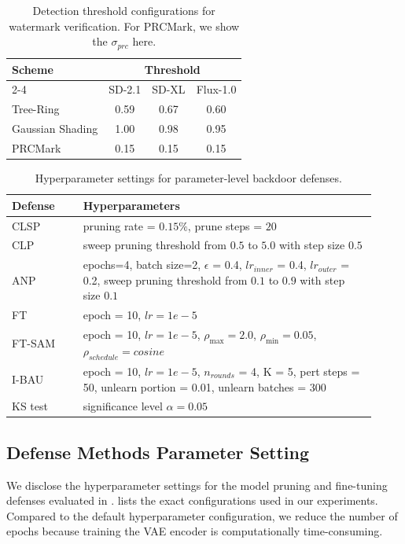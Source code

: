 \documentclass[letterpaper,twocolumn,10pt]{article}
\begin{document}
\begin{table}[t]
\centering
\caption{Detection threshold configurations for watermark verification.
For PRCMark, we show the $\sigma_{prc}$ here.}
\label{tab:wm_thresholds}
\small
\setlength{\tabcolsep}{6pt}
\renewcommand{\arraystretch}{1.15}
\begin{tabular}{lccc}
\toprule
\multirow{2}{*}{Scheme} & \multicolumn{3}{c}{Threshold} \\
\cmidrule(lr){2-4}
& SD-2.1 & SD-XL & Flux-1.0 \\
\midrule
Tree-Ring       & 0.59 & 0.67 & 0.60 \\
Gaussian Shading  & 1.00 & 0.98 & 0.95 \\
PRCMark          & 0.15 & 0.15 & 0.15 \\
\bottomrule
\end{tabular}
\end{table}
\begin{table}[t]
\centering
\caption{Hyperparameter settings for parameter-level backdoor defenses.}
\label{tab:defense_hparams_compact}
\small
\setlength{\tabcolsep}{4.5pt}
\begin{tabular}{p{0.18\linewidth} p{0.74\linewidth}}
\toprule
Defense & Hyperparameters  \\
\midrule
CLSP &   pruning rate = $0.15\%$, prune steps = $20$ \\
\midrule
CLP &    sweep pruning threshold from $0.5$ to $5.0$ with step size $0.5$ \\
\midrule
ANP &
epochs=4, batch size=2, $\epsilon$ = 0.4, $lr_{inner}$ = 0.4, $lr_{outer}$ = 0.2, sweep pruning threshold from $0.1$ to $0.9$ with step size $0.1$\\
\midrule
FT & epoch = 10, $lr=1e-5$ \\
\midrule
FT-SAM &  epoch = 10, $lr=1e-5$, $\rho_{\max}=2.0$, $\rho_{\min}=0.05$, $\rho_{schedule} = cosine$\\
\midrule
I-BAU & epoch = 10, $lr=1e-5$, $n_{rounds}$ = 4, K = 5, pert steps = 50, unlearn portion = 0.01, unlearn batches = 300\\
\midrule
KS test & significance level $\alpha=0.05$\\
\bottomrule
\end{tabular}
\end{table}

\subsection{Defense Methods Parameter Setting}
\label{appendix: hyper-parameter}
We disclose the hyperparameter settings for the model pruning and fine-tuning defenses evaluated in .
 lists the exact configurations used in our experiments.
Compared to the default hyperparameter configuration, we reduce the number of epochs because training the VAE encoder is computationally time-consuming.
\end{document}

